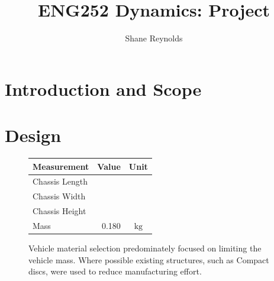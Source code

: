 \documentclass[a4paper]{article}
\begin{document}
\title{ENG252 Dynamics: Project}
\author{Shane Reynolds}
\maketitle

\section{Introduction and Scope}

\section{Design}

\begin{figure}[h]
	\centering
	\begin{minipage}{0.55\textwidth}
		\centering
		\caption{Vehicle material selection predominately focused on limiting the vehicle mass. Where possible existing structures, such as Compact discs, were used to reduce manufacturing effort.}
	\end{minipage}
	\hspace{0.5cm}
	\begin{minipage}{0.35\textwidth}
		\centering
		\begin{tabular}{lrc}
			\toprule
			Measurement & Value & Unit \\
			\midrule
			Chassis Length & & \\
			Chassis Width & & \\
			Chassis Height & & \\
			Mass & 0.180 & $\si{\kilogram}$ \\
			\bottomrule
		\end{tabular}
	\end{minipage}
	
\end{figure}
\end{document}
